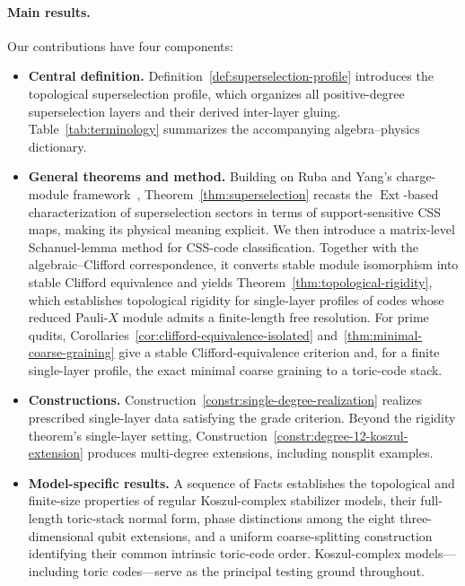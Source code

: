 \documentclass[aps,prx,english,superscriptaddress,twocolumn,tightenlines,showpacs,longbibliography,floatfix,amsfonts]{revtex4-2}
\theoremstyle{remark}
\theoremstyle{definition}
\begin{document}
	\paragraph*{Main results.}
	Our contributions have four components:
	\begin{itemize}
		\item \textbf{Central definition.}
		Definition~\ref{def:superselection-profile} introduces the topological
		superselection profile, which organizes all positive-degree
		superselection layers and their derived inter-layer gluing.
		Table~\ref{tab:terminology} summarizes the accompanying algebra--physics
		dictionary.

		\item \textbf{General theorems and method.}
		Building on Ruba and Yang's charge-module framework~\cite{Yang2023},
		Theorem~\ref{thm:superselection} recasts the \(\operatorname{Ext}\)-based
		characterization of superselection sectors in terms of support-sensitive CSS
		maps, making its physical meaning explicit. We
		then introduce a matrix-level Schanuel-lemma method for CSS-code
		classification. Together with the algebraic--Clifford correspondence, it
		converts stable module isomorphism into stable Clifford equivalence and yields
		Theorem~\ref{thm:topological-rigidity}, which establishes topological rigidity
		for single-layer profiles of codes whose reduced Pauli-\(X\) module admits a
		finite-length free resolution. For prime qudits,
		Corollaries~\ref{cor:clifford-equivalence-isolated}
		and~\ref{thm:minimal-coarse-graining} give a stable Clifford-equivalence
		criterion and, for a finite single-layer profile, the exact minimal coarse
		graining to a toric-code stack.

		\item \textbf{Constructions.}
		Construction~\ref{constr:single-degree-realization} realizes prescribed
		single-layer data satisfying the grade criterion. Beyond the rigidity
		theorem's single-layer setting,
		Construction~\ref{constr:degree-12-koszul-extension} produces multi-degree
		extensions, including nonsplit examples.

		\item \textbf{Model-specific results.}
		A sequence of Facts establishes the topological and finite-size properties
		of regular Koszul-complex stabilizer models, their full-length toric-stack normal form,
		phase distinctions among the eight three-dimensional qubit extensions, and
		a uniform coarse-splitting construction identifying their common intrinsic
		toric-code order.
		Koszul-complex models---including toric codes---serve as the principal
		testing ground throughout.
	\end{itemize}
\end{document}
